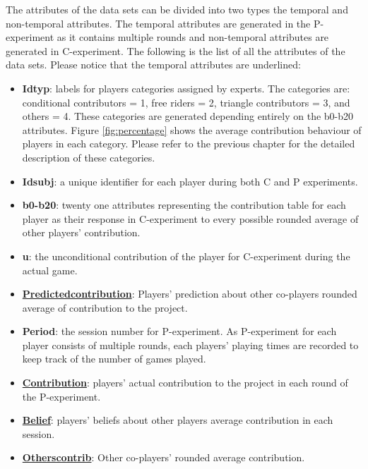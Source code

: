 The attributes of the data sets can be divided into two types the temporal and non-temporal attributes. The temporal attributes are generated in the P-experiment as it contains multiple rounds and non-temporal attributes are generated in C-experiment. The following is the list of all the attributes of the data sets. Please notice that the temporal attributes are underlined:
\begin{itemize}
\item \textbf{Idtyp}: labels for players categories assigned by experts. The categories are: conditional contributors = 1, free riders = 2, triangle contributors = 3, and others = 4. These categories are generated depending entirely on the b0-b20 attributes. Figure \ref{fig:percentage} shows the average contribution behaviour of players in each category. Please refer to the previous chapter for the detailed description of these categories.

\item \textbf{Idsubj}: a unique identifier for each player during both C and P experiments.

\item \textbf{b0-b20}: twenty one attributes representing the contribution table for each player as their response in C-experiment to every possible rounded average of other players' contribution.

\item \textbf{u}: the unconditional contribution of the player for C-experiment during the actual game.

\item \textbf{\underline{Predictedcontribution}}: Players' prediction about other co-players rounded average of contribution to the project.

\item \textbf{Period}: the session number for P-experiment. As P-experiment for each player consists of multiple rounds, each players' playing times are recorded to keep track of the number of games played.

\item \textbf{\underline{Contribution}}: players' actual contribution to the project in each round of the P-experiment.

\item \textbf{\underline{Belief}}: players' beliefs about other players average contribution in each session.

\item \textbf{\underline{Otherscontrib}}: Other co-players' rounded average contribution.


\end{itemize}

